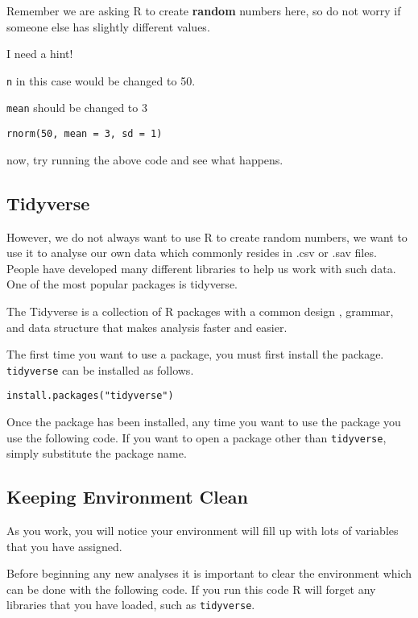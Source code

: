 \documentclass[]{book}
\begin{document}
Remember we are asking R to create \textbf{random} numbers here, so do not worry if someone else has slightly different values.

I need a hint!

\texttt{n} in this case would be changed to 50.

\texttt{mean} should be changed to 3

\texttt{rnorm(50,\ mean\ =\ 3,\ sd\ =\ 1)}

now, try running the above code and see what happens.

\hypertarget{tidyverse}{%
\subsection{Tidyverse}\label{tidyverse}}

However, we do not always want to use R to create random numbers, we want to use it to analyse our own data which commonly resides in .csv or .sav files. People have developed many different libraries to help us work with such data. One of the most popular packages is tidyverse.

The Tidyverse is a collection of R packages with a common design , grammar, and data structure that makes analysis faster and easier.

The first time you want to use a package, you must first install the package. \texttt{tidyverse} can be installed as follows.

\begin{verbatim}
install.packages("tidyverse")
\end{verbatim}

Once the package has been installed, any time you want to use the package you use the following code. If you want to open a package other than \texttt{tidyverse}, simply substitute the package name.

\hypertarget{keeping-environment-clean}{%
\subsection{Keeping Environment Clean}\label{keeping-environment-clean}}

As you work, you will notice your environment will fill up with lots of variables that you have assigned.

Before beginning any new analyses it is important to clear the environment which can be done with the following code. If you run this code R will forget any libraries that you have loaded, such as \texttt{tidyverse}.
\end{document}
